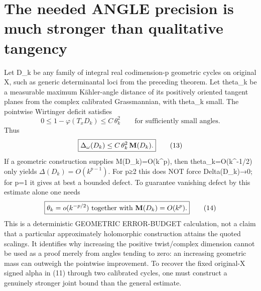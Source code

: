\documentclass[11pt]{article}
\begin{document}
\section{The needed ANGLE precision is much stronger than qualitative tangency}
Let D_k be any family
of integral real
codimension-p geometric
cycles on original X,
such as generic
determinantal loci from
the preceding theorem.
Let theta_k be a
measurable maximum
Kähler-angle distance
of its positively
oriented tangent
planes from the
complex calibrated
Grassmannian, with
theta_k small.
The pointwise
Wirtinger deficit
satisfies
\[
 0\le 1-\varphi(T_xD_k)
        \le C\,\theta_k^2
 \qquad\text{for
 sufficiently small angles}.
\]
Thus
\[
 \boxed{
 \Delta_\omega(D_k)
 \le C\,\theta_k^2\,{\bf M}(D_k).
 }                                                     \tag{13}
\]
If a geometric
construction supplies
M(D_k)=O(k^p), then
theta_k=O(k^{-1/2})
only yields
$\Delta(D_k)=O(k^{p-1})$.
For p≥2 this does NOT
force Delta(D_k)→0;
for p=1 it gives at
best a bounded defect.
To guarantee
vanishing defect
by this estimate
alone one needs
\[
 \boxed{
 \theta_k=o(k^{-p/2})
   \text{ together with }
 {\bf M}(D_k)=O(k^p).
 }                                                     \tag{14}
\]
This is a deterministic
GEOMETRIC ERROR-BUDGET
calculation, not a claim
that a particular
approximately holomorphic
construction attains
the quoted scalings.
It identifies why
increasing the positive
twist/complex dimension
cannot be used as a
proof merely from
angles tending to zero:
an increasing
geometric mass can
outweigh the
pointwise improvement.
To recover the fixed
original-X signed alpha
in (11) through
two calibrated cycles,
one must construct
a genuinely stronger
joint bound than
the general estimate.
\end{document}
